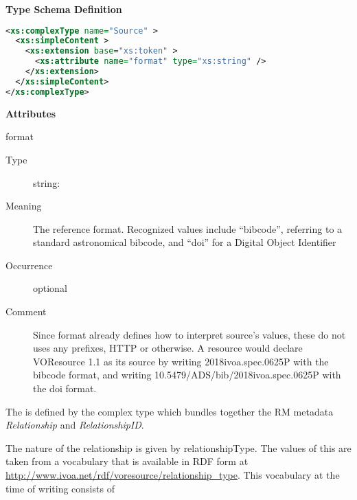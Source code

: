 \documentclass[11pt,a4paper]{ivoa}
\begin{document}
\begin{generated}
\begingroup
        \renewcommand*\descriptionlabel[1]{%
        \hbox to 5.5em{\emph{#1}\hfil}}\vspace{1ex}\noindent\textbf{ Type Schema Definition}

\begin{lstlisting}[language=XML,basicstyle=\footnotesize]
<xs:complexType name="Source" >
  <xs:simpleContent >
    <xs:extension base="xs:token" >
      <xs:attribute name="format" type="xs:string" />
    </xs:extension>
  </xs:simpleContent>
</xs:complexType>
\end{lstlisting}

\vspace{0.5ex}\noindent\textbf{ Attributes}

\begingroup\small\begin{bigdescription}
\item[format]
\begin{description}
\item[Type] string: 
\item[Meaning]
                 The reference format.  Recognized values include “bibcode”,
                 referring to a standard astronomical bibcode, and
                 “doi” for a Digital Object Identifier

\item[Occurrence] optional
\item[Comment]
               	Since format already defines how to interpret source's
               	values, these do not uses any prefixes, HTTP or otherwise.
               	A resource would declare VOResource 1.1 as its source by
               	writing 2018ivoa.spec.0625P with the bibcode format, and
               	writing 10.5479/ADS/bib/2018ivoa.spec.0625P with the doi
               	format.

\end{description}


\end{bigdescription}\endgroup

\endgroup
\end{generated}



The  is defined by the
 complex type which bundles together the
RM metadata \emph{Relationship} and
\emph{RelationshipID}.

The nature of the relationship is given by relationshipType.  The values
of this are taken from a vocabulary that is available in RDF form at
\url{http://www.ivoa.net/rdf/voresource/relationship_type}.  This
vocabulary at the time of writing consists of
\end{document}
